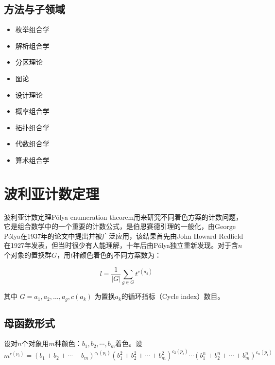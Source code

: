 \documentclass[12pt]{article} %
\begin{document}
\subsection{方法与子领域}
\begin{itemize}

    \item 枚举组合学
    \item 解析组合学
    \item 分区理论
    \item 图论
    \item 设计理论
    \item 概率组合学
    \item 拓扑组合学
    \item 代数组合学
    \item 算术组合学
\end{itemize}






\section{波利亚计数定理}
波利亚计数定理Pólya enumeration theorem用来研究不同着色方案的计数问题，它是组合数学中的一个重要的计数公式，是伯恩赛德引理的一般化，由George Pólya在1937年的论文\cite{GP}中提出并被广泛应用，该结果首先由John Howard Redfield在1927年发表，但当时很少有人能理解，十年后由Pólya独立重新发现。对于含$n$个对象的置换群$G$，用$t$种颜色着色的不同方案数为：

\begin{equation}
\label{eqn:eqn1}
l=\frac{1}{|G|} \sum_{g \in G} t^{c\left(a_{g}\right)}
\end{equation}

其中 $G=a_{1}, a_{2}, \ldots, a_{g}, c\left(a_{k}\right)$ 为置换$a_{k}$的循环指标（Cycle index）数目。

\subsection{母函数形式}
设对$n$个对象用$m$种颜色：$b_{1}, b_{2}, \cdots, b_{m}$着色。设
\begin{equation}
\label{eqn:eqn1}
m^{c\left(p_{i}\right)}=\left(b_{1}+b_{2}+\cdots+b_{m}\right)^{c_{1}\left(p_{i}\right)}\left(b_{1}^{2}+b_{2}^{2}+\cdots+b_{m}^{2}\right)^{c_{2}\left(p_{i}\right)} \cdots\left(b_{1}^{n}+b_{2}^{n}+\cdots+b_{m}^{n}\right)^{c_{n}\left(p_{i}\right)}
\end{equation}
\end{document}
